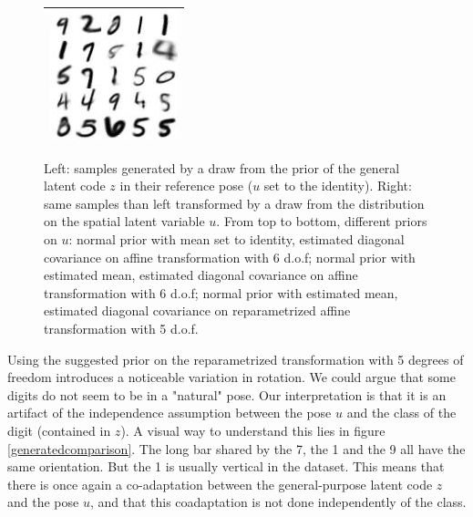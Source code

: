 \documentclass[letterpaper, twoside]{article}
\begin{document}
\begin{figure}[H]
\begin{minipage}{.5\textwidth}
\begin{tabular}{|@{}c@{}|}
  \includegraphics[scale=1]{manifold_sig_62.jpg}\\ \hline
  \end{tabular}
  \end{minipage}%
  \caption{Left: samples generated by a draw from the prior of the general latent code $z$ in their reference pose ($u$ set to the identity). Right: same samples than left transformed by a draw from the distribution on the spatial latent variable $u$. From top to bottom, different priors on $u$: normal prior with mean set to identity, estimated diagonal covariance on affine transformation with 6 d.o.f; normal prior with estimated mean, estimated diagonal covariance on affine transformation with 6 d.o.f; normal prior with estimated mean, estimated diagonal covariance on reparametrized affine transformation with 5 d.o.f.}
  \label{generatedwithpose} 
  \end{figure}

    Using the suggested prior on the reparametrized transformation with 5 degrees of freedom introduces a noticeable variation in rotation. We could argue that some digits do not seem to be in a "natural" pose. Our interpretation is that it is an artifact of the independence assumption between the pose $u$ and the class of the digit (contained in $z$). A visual way to understand this lies in figure \ref{generatedcomparison}. The long bar shared by the 7, the 1 and the 9 all have the same orientation. But the 1 is usually vertical in the dataset. This means that there is once again a co-adaptation between the general-purpose latent code $z$ and the pose $u$, and that this coadaptation is not done independently of the class.\\
\end{document}
